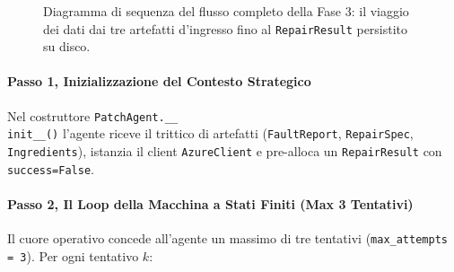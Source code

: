 \begin{figure}[H]
{
    }
    \caption{Diagramma di sequenza del flusso completo della Fase 3: il viaggio dei dati dai tre artefatti
    d'ingresso fino al \texttt{RepairResult} persistito su disco.}
    \label{fig:sequence_fase3}
\end{figure}

\paragraph{Passo 1, Inizializzazione del Contesto Strategico}
Nel costruttore \texttt{PatchAgent.\_\_\\init\_\_()} l'agente riceve il trittico di artefatti (\texttt{FaultReport},
\texttt{RepairSpec}, \texttt{Ingredients}), istanzia il client \texttt{AzureClient} e pre-alloca un
\texttt{RepairResult} con \texttt{success=False}.

\paragraph{Passo 2, Il Loop della Macchina a Stati Finiti (Max 3 Tentativi)}
Il cuore operativo concede all'agente un massimo di tre tentativi (\texttt{max\_attempts = 3}). Per ogni tentativo $k$:

